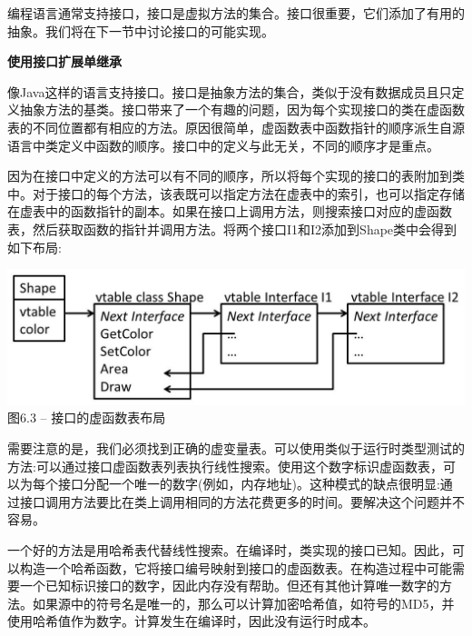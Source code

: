 编程语言通常支持接口，接口是虚拟方法的集合。接口很重要，它们添加了有用的抽象。我们将在下一节中讨论接口的可能实现。\par

\hspace*{\fill} \par %
\textbf{使用接口扩展单继承}

像Java这样的语言支持接口。接口是抽象方法的集合，类似于没有数据成员且只定义抽象方法的基类。接口带来了一个有趣的问题，因为每个实现接口的类在虚函数表的不同位置都有相应的方法。原因很简单，虚函数表中函数指针的顺序派生自源语言中类定义中函数的顺序。接口中的定义与此无关，不同的顺序才是重点。\par

因为在接口中定义的方法可以有不同的顺序，所以将每个实现的接口的表附加到类中。对于接口的每个方法，该表既可以指定方法在虚表中的索引，也可以指定存储在虚表中的函数指针的副本。如果在接口上调用方法，则搜索接口对应的虚函数表，然后获取函数的指针并调用方法。将两个接口I1和I2添加到Shape类中会得到如下布局:\par

\hspace*{\fill} \par %
\begin{center}
\includegraphics{content/2/chapter6/images/3.jpg}\\
图6.3 – 接口的虚函数表布局
\end{center}

需要注意的是，我们必须找到正确的虚变量表。可以使用类似于运行时类型测试的方法:可以通过接口虚函数表列表执行线性搜索。使用这个数字标识虚函数表，可以为每个接口分配一个唯一的数字(例如，内存地址)。这种模式的缺点很明显:通过接口调用方法要比在类上调用相同的方法花费更多的时间。要解决这个问题并不容易。\par

一个好的方法是用哈希表代替线性搜索。在编译时，类实现的接口已知。因此，可以构造一个哈希函数，它将接口编号映射到接口的虚函数表。在构造过程中可能需要一个已知标识接口的数字，因此内存没有帮助。但还有其他计算唯一数字的方法。如果源中的符号名是唯一的，那么可以计算加密哈希值，如符号的MD5，并使用哈希值作为数字。计算发生在编译时，因此没有运行时成本。\par

